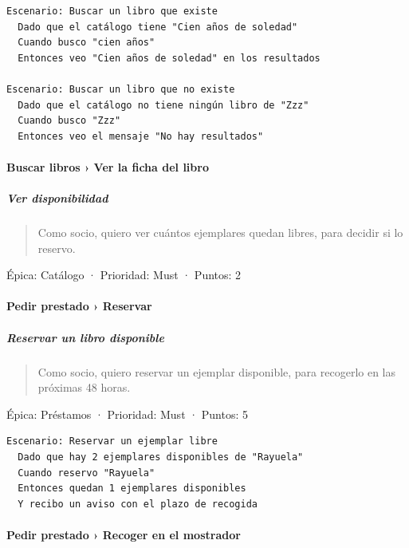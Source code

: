 \begin{Verbatim}[breaklines,fontsize=\small,frame=single,framerule=0.4pt,rulecolor=\color{black!25}]
Escenario: Buscar un libro que existe
  Dado que el catálogo tiene "Cien años de soledad"
  Cuando busco "cien años"
  Entonces veo "Cien años de soledad" en los resultados

Escenario: Buscar un libro que no existe
  Dado que el catálogo no tiene ningún libro de "Zzz"
  Cuando busco "Zzz"
  Entonces veo el mensaje "No hay resultados"
\end{Verbatim}

\paragraph*{Buscar libros › Ver la ficha del libro}

\subparagraph*{Ver disponibilidad}

\begin{quote}
Como socio, quiero ver cuántos ejemplares quedan libres, para decidir si lo reservo.
\end{quote}

Épica: Catálogo · Prioridad: Must · Puntos: 2

\paragraph*{Pedir prestado › Reservar}

\subparagraph*{Reservar un libro disponible}

\begin{quote}
Como socio, quiero reservar un ejemplar disponible, para recogerlo en las próximas 48 horas.
\end{quote}

Épica: Préstamos · Prioridad: Must · Puntos: 5

\begin{Verbatim}[breaklines,fontsize=\small,frame=single,framerule=0.4pt,rulecolor=\color{black!25}]
Escenario: Reservar un ejemplar libre
  Dado que hay 2 ejemplares disponibles de "Rayuela"
  Cuando reservo "Rayuela"
  Entonces quedan 1 ejemplares disponibles
  Y recibo un aviso con el plazo de recogida
\end{Verbatim}

\paragraph*{Pedir prestado › Recoger en el mostrador}

